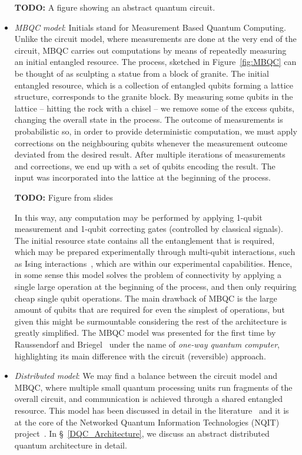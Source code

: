 \begin{itemize}
  \textbf{TODO:} A figure showing an abstract quantum circuit.

  \item \textit{MBQC model}: Initials stand for Measurement Based Quantum Computing. Unlike the circuit model, where measurements are done at the very end of the circuit, MBQC carries out computations by means of repeatedly measuring an initial entangled resource. The process, sketched in Figure~\ref{fig:MBQC} can be thought of as sculpting a statue from a block of granite. The initial entangled resource, which is a collection of entangled qubits forming a lattice structure, corresponds to the granite block. By measuring some qubits in the lattice -- hitting the rock with a chisel -- we remove some of the excess qubits, changing the overall state in the process. The outcome of measurements is probabilistic so, in order to provide deterministic computation, we must apply corrections on the neighbouring qubits whenever the measurement outcome deviated from the desired result. After multiple iterations of measurements and corrections, we end up with a set of qubits encoding the result. The input was incorporated into the lattice at the beginning of the process.

  \textbf{TODO:} Figure from slides %

  In this way, any computation may be performed by applying 1-qubit measurement and 1-qubit correcting gates (controlled by classical signals). The initial resource state contains all the entanglement that is required, which may be prepared experimentally through multi-qubit interactions, such as Ising interactions~\citep{1WQC}, which are within our experimental capabilities. Hence, in some sense this model solves the problem of connectivity by applying a single large operation at the beginning of the process, and then only requiring cheap single qubit operations. The main drawback of MBQC is the large amount of qubits that are required for even the simplest of operations, but given this might be surmountable considering the rest of the architecture is greatly simplified. The MBQC model was presented for the first time by Raussendorf and Briegel~\citep{1WQC} under the name of \textit{one-way quantum computer}, highlighting its main difference with the circuit (reversible) approach. 

  \item \textit{Distributed model}: We may find a balance between the circuit model and MBQC, where multiple small quantum processing units run fragments of the overall circuit, and communication is achieved through a shared entangled resource. This model has been discussed in detail in the literature~\citep{RealDQC} and it is at the core of the Networked Quantum Information Technologies (NQIT) project~\citep{NQIT}. In \S~\ref{DQC_Architecture}, we discuss an abstract distributed quantum architecture in detail.

\end{itemize}


